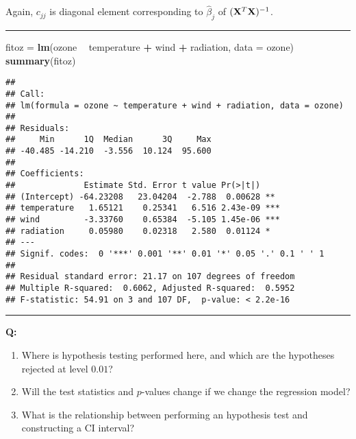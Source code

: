\documentclass[]{article}
\newenvironment{Shaded}{\begin{snugshade}}{\end{snugshade}}
\newcommand{\DataTypeTok}[1]{\textcolor[rgb]{0.13,0.29,0.53}{#1}}
\newcommand{\KeywordTok}[1]{\textcolor[rgb]{0.13,0.29,0.53}{\textbf{#1}}}
\newcommand{\NormalTok}[1]{#1}
\newcommand{\OperatorTok}[1]{\textcolor[rgb]{0.81,0.36,0.00}{\textbf{#1}}}
\newcommand{\StringTok}[1]{\textcolor[rgb]{0.31,0.60,0.02}{#1}}
\providecommand{\tightlist}{%
  \setlength{\itemsep}{0pt}\setlength{\parskip}{0pt}}
\begin{document}
Again, \(c_{jj}\) is diagonal element corresponding to \(\hat{\beta}_j\)
of \(({\bf X}^T{\bf X})^{-1}\).

\begin{center}\rule{0.5\linewidth}{\linethickness}\end{center}

\footnotesize

\begin{Shaded}
\begin{Highlighting}[]
\NormalTok{fitoz =}\StringTok{ }\KeywordTok{lm}\NormalTok{(ozone }\OperatorTok{~}\StringTok{ }\NormalTok{temperature }\OperatorTok{+}\StringTok{ }\NormalTok{wind }\OperatorTok{+}\StringTok{ }\NormalTok{radiation, }\DataTypeTok{data =}\NormalTok{ ozone)}
\KeywordTok{summary}\NormalTok{(fitoz)}
\end{Highlighting}
\end{Shaded}

\begin{verbatim}
## 
## Call:
## lm(formula = ozone ~ temperature + wind + radiation, data = ozone)
## 
## Residuals:
##     Min      1Q  Median      3Q     Max 
## -40.485 -14.210  -3.556  10.124  95.600 
## 
## Coefficients:
##              Estimate Std. Error t value Pr(>|t|)    
## (Intercept) -64.23208   23.04204  -2.788  0.00628 ** 
## temperature   1.65121    0.25341   6.516 2.43e-09 ***
## wind         -3.33760    0.65384  -5.105 1.45e-06 ***
## radiation     0.05980    0.02318   2.580  0.01124 *  
## ---
## Signif. codes:  0 '***' 0.001 '**' 0.01 '*' 0.05 '.' 0.1 ' ' 1
## 
## Residual standard error: 21.17 on 107 degrees of freedom
## Multiple R-squared:  0.6062, Adjusted R-squared:  0.5952 
## F-statistic: 54.91 on 3 and 107 DF,  p-value: < 2.2e-16
\end{verbatim}

\normalsize

\begin{center}\rule{0.5\linewidth}{\linethickness}\end{center}

\textbf{Q:}

\begin{enumerate}
\def\labelenumi{\arabic{enumi}.}
\tightlist
\item
  Where is hypothesis testing performed here, and which are the
  hypotheses rejected at level \(0.01\)?
\item
  Will the test statistics and \(p\)-values change if we change the
  regression model?
\item
  What is the relationship between performing an hypothesis test and
  constructing a CI interval?
\end{enumerate}
\end{document}

